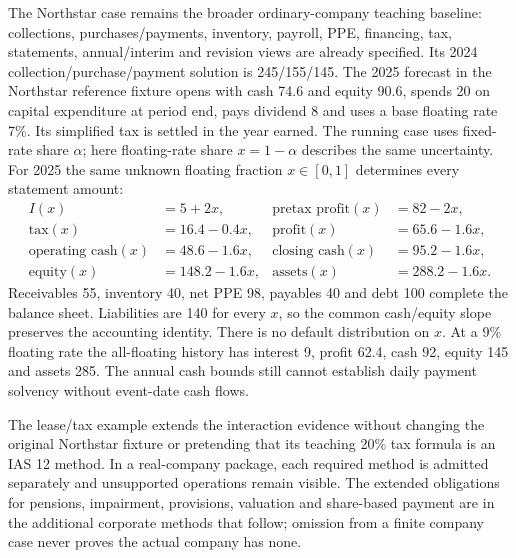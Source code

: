 The Northstar case remains the broader ordinary-company teaching baseline: collections, purchases/payments, inventory, payroll, PPE, financing, tax, statements, annual/interim and revision views are already specified. Its 2024 collection/purchase/payment solution is 245/155/145. The 2025 forecast in the Northstar reference fixture opens with cash 74.6 and equity 90.6, spends 20 on capital expenditure at period end, pays dividend 8 and uses a base floating rate 7\%. Its simplified tax is settled in the year earned. The running case uses fixed-rate share $\alpha$; here floating-rate share $x=1-\alpha$ describes the same uncertainty. For 2025 the same unknown floating fraction $x\in[0,1]$ determines every
statement amount:
\begin{align*}
 I(x)&=5+2x, & \text{pretax profit}(x)&=82-2x,\\
 \text{tax}(x)&=16.4-0.4x, & \text{profit}(x)&=65.6-1.6x,\\
 \text{operating cash}(x)&=48.6-1.6x, & \text{closing cash}(x)&=95.2-1.6x,\\
 \text{equity}(x)&=148.2-1.6x, & \text{assets}(x)&=288.2-1.6x.
\end{align*}
Receivables 55, inventory 40, net PPE 98, payables 40 and debt 100 complete the
balance sheet. Liabilities are 140 for every $x$, so the common cash/equity
slope preserves the accounting identity. There is no default distribution on
$x$. At a 9\% floating rate the all-floating history has interest 9, profit
62.4, cash 92, equity 145 and assets 285. The annual cash bounds still cannot
establish daily payment solvency without event-date cash flows.

The lease/tax example extends the interaction evidence without changing the original Northstar fixture or pretending that its teaching 20\% tax formula is an IAS 12 method. In a real-company package, each required method is admitted separately and unsupported operations remain visible. The extended obligations for pensions, impairment, provisions, valuation and share-based payment are in the additional corporate methods that follow; omission from a finite company case never proves the actual company has none.
